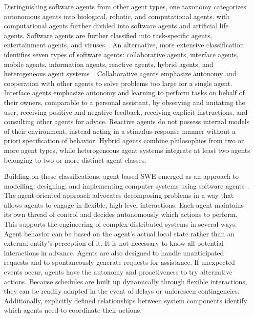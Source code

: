 \documentclass[
english,                 %
bibtex,                  %
includeExtraAbstracts, %
]{kththesis}
\numberwithin{listing}{chapter}
\begin{document}
Distinguishing software agents from other agent types, one taxonomy categorizes autonomous agents into biological, robotic, and computational agents, with computational agents further divided into software agents and artificial life agents. Software agents are further classified into task-specific agents, entertainment agents, and viruses~\cite{franklin_is_1997}. An alternative, more extensive classification identifies seven types of software agents: collaborative agents, interface agents, mobile agents, information agents, reactive agents, hybrid agents, and heterogeneous agent systems~\cite{nwana_software_1996}. Collaborative agents emphasize autonomy and cooperation with other agents to solve problems too large for a single agent. Interface agents emphasize autonomy and learning to perform tasks on behalf of their owners, comparable to a personal assistant, by observing and imitating the user, receiving positive and negative feedback, receiving explicit instructions, and consulting other agents for advice. Reactive agents do not possess internal models of their environment, instead acting in a stimulus-response manner without a priori specification of behavior. Hybrid agents combine philosophies from two or more agent types, while heterogeneous agent systems integrate at least two agents belonging to two or more distinct agent classes.

Building on these classifications, agent-based \gls{SWE} emerged as an approach to modelling, designing, and implementing computer systems using software agents~\cite{jennings_agent-based_2000}. The agent-oriented approach advocates decomposing problems in a way that allows agents to engage in flexible, high-level interactions. Each agent maintains its own thread of control and decides autonomously which actions to perform. This supports the engineering of complex distributed systems in several ways. Agent behavior can be based on the agent's actual local state rather than an external entity's perception of it. It is not necessary to know all potential interactions in advance. Agents are also designed to handle unanticipated requests and to spontaneously generate requests for assistance. If unexpected events occur, agents have the autonomy and proactiveness to try alternative actions. Because schedules are built up dynamically through flexible interactions, they can be readily adapted in the event of delays or unforeseen contingencies. Additionally, explicitly defined relationships between system components identify which agents need to coordinate their actions.
\end{document}

